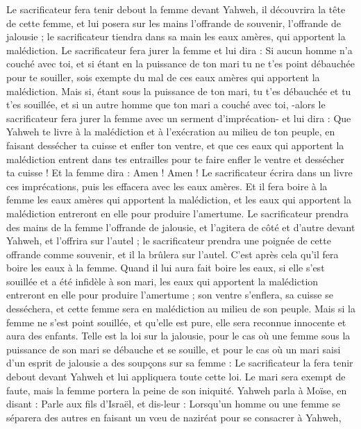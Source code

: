 \begin{multicols}{2}
Le sacrificateur fera tenir debout la femme devant Yahweh, il découvrira la tête de cette femme, et lui posera sur les mains l’offrande de souvenir, l’offrande de jalousie ; le sacrificateur tiendra dans sa main les eaux amères, qui apportent la malédiction.
Le sacrificateur fera jurer la femme et lui dira : Si aucun homme n'a couché avec toi, et si étant en la puissance de ton mari tu ne t'es point débauchée pour te souiller, sois exempte du mal de ces eaux amères qui apportent la malédiction.
Mais si, étant sous la puissance de ton mari, tu t'es débauchée et tu t'es souillée, et si un autre homme que ton mari a couché avec toi,
-alors le sacrificateur fera jurer la femme avec un serment d'imprécation- et lui dira : Que Yahweh te livre à la malédiction et à l'exécration au milieu de ton peuple, en faisant dessécher ta cuisse et enfler ton ventre,
et que ces eaux qui apportent la malédiction entrent dans tes entrailles pour te faire enfler le ventre et dessécher ta cuisse ! Et la femme dira : Amen ! Amen !
Le sacrificateur écrira dans un livre ces imprécations, puis les effacera avec les eaux amères.
Et il fera boire à la femme les eaux amères qui apportent la malédiction, et les eaux qui apportent la malédiction entreront en elle pour produire l’amertume.
Le sacrificateur prendra des mains de la femme l’offrande de jalousie, et l’agitera de côté et d’autre devant Yahweh, et l'offrira sur l'autel ;
le sacrificateur prendra une poignée de cette offrande comme souvenir, et il la brûlera sur l'autel. C’est après cela qu’il fera boire les eaux à la femme.
Quand il lui aura fait boire les eaux, si elle s’est souillée et a été infidèle à son mari, les eaux qui apportent la malédiction entreront en elle pour produire l’amertume ; son ventre s’enflera, sa cuisse se desséchera, et cette femme sera en malédiction au milieu de son peuple.
Mais si la femme ne s'est point souillée, et qu'elle est pure, elle sera reconnue innocente et aura des enfants.
Telle est la loi sur la jalousie, pour le cas où une femme sous la puissance de son mari se débauche et se souille,
et pour le cas où un mari saisi d’un esprit de jalousie a des soupçons sur sa femme : Le sacrificateur la fera tenir debout devant Yahweh et lui appliquera toute cette loi.
Le mari sera exempt de faute, mais la femme portera la peine de son iniquité.
\VerseOne{}Yahweh parla à Moïse, en disant :
Parle aux fils d'Israël, et dis-leur : Lorsqu’un homme ou une femme se séparera des autres en faisant un vœu de naziréat pour se consacrer à Yahweh,

\end{multicols}
